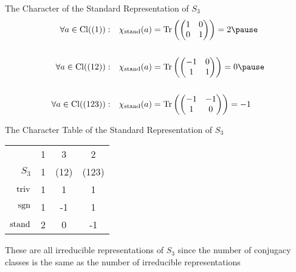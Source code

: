 \begin{frame}{The Character of the Standard Representation of $S_3$}
    \large
   \begin{align*}
    \forall a \in \Cl((1)): \quad & \chi_{\stand}(a) = \Tr\left(
        \begin{pmatrix}
            1 & 0 \\
            0 & 1
        \end{pmatrix}
    \right) = 2 \pause \\\\
    \forall a \in \Cl((12)): \quad & \chi_{\stand}(a) = \Tr\left(
        \begin{pmatrix}
            -1 & 0 \\
            1 & 1
        \end{pmatrix}
    \right) = 0 \pause \\\\
    \forall a \in \Cl((123)): \quad & \chi_{\stand}(a) = \Tr\left(
        \begin{pmatrix}
            -1 & -1 \\
            1 & 0
        \end{pmatrix}
    \right) = -1
   \end{align*} 
\end{frame}

\begin{frame}{The Character Table of the Standard Representation of $S_3$}
    \large
    \begin{center}
        \begin{tabular}{r | c  c  c}
                        & 1 & 3     & 2     \\
            $S_3$       & 1 & (12)  & (123) \\ \hline \pause
            $\operatorname{triv}$     & 1 & 1     & 1     \\ \pause
            $\operatorname{sgn}$      & 1 & -1    & 1     \\ \pause
            $\operatorname{stand}$    & 2 & 0     & -1
        \end{tabular}
    \end{center}
    
    \pause
    \vspace{2em}
    These are all irreducible representations of $S_3$ since the number of conjugacy classes is the same as the number of irreducible representations

\end{frame}

